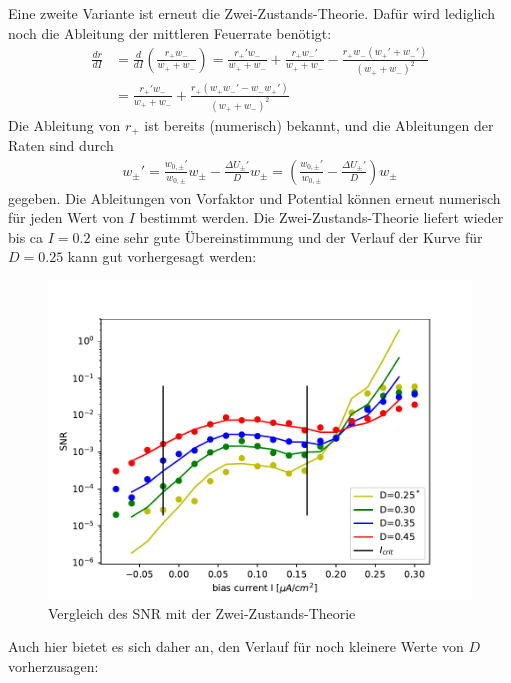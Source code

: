 \documentclass[12pt,a4paper]{article}
\begin{document}
Eine zweite Variante ist erneut die Zwei-Zustands-Theorie. Dafür wird lediglich noch die Ableitung der mittleren Feuerrate benötigt:
\begin{align*}
\frac{dr}{dI}&=\frac{d}{dI}\left(\frac{r_+w_-}{w_++w_-}\right)=\frac{r_+'w_-}{w_++w_-}+\frac{r_+w_-'}{w_++w_-}-\frac{r_+w_-(w_+'+w_-')}{(w_++w_-)^2}\\
&=\frac{r_+'w_-}{w_++w_-}+\frac{r_+(w_+w_-'-w_-w_+')}{(w_++w_-)^2}
\end{align*}
Die Ableitung von $r_+$ ist bereits (numerisch) bekannt, und die Ableitungen der Raten sind durch
\begin{align*}
w_\pm'=\frac{w_{0,\pm}'}{w_{0,\pm}}w_\pm-\frac{\Delta U_\pm'}{D}w_\pm=\left(\frac{w_{0,\pm}'}{w_{0,\pm}}-\frac{\Delta U_\pm'}{D}\right)w_\pm
\end{align*}
gegeben. Die Ableitungen von Vorfaktor und Potential können erneut numerisch für jeden Wert von $I$ bestimmt werden. Die Zwei-Zustands-Theorie liefert wieder bis ca $I=0.2$ eine sehr gute Übereinstimmung und der Verlauf der Kurve für $D=0.25$ kann gut vorhergesagt werden:
\begin{figure}[H]
	\centering
	\includegraphics[scale=1]{snrtwostate.pdf}\caption{Vergleich des SNR mit der Zwei-Zustands-Theorie}
	\label{snrtwostate}
\end{figure}
Auch hier bietet es sich daher an, den Verlauf für noch kleinere Werte von $D$ vorherzusagen:
\end{document}
